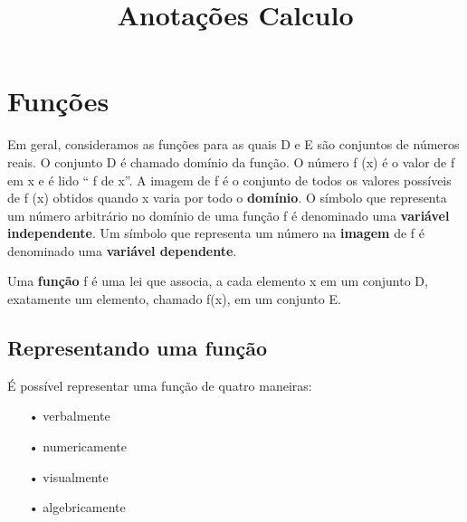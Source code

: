 \documentclass[10pt,a4paper]{article}
\title{Anotações Calculo}
\begin{document}
\maketitle
\tableofcontents
\newpage


\section{Funções}
Em geral, consideramos as funções para as quais D e E são conjuntos de números reais. O conjunto D é chamado domínio da função. O número f (x) é o valor de f em x e é lido “ f de x”. A imagem de f é o conjunto de todos os valores possíveis de f (x) obtidos quando x varia por todo o \textbf{domínio}. O símbolo que representa um número arbitrário no domínio de uma função f é denominado uma \textbf{variável independente}. Um símbolo que representa um número na \textbf{imagem} de f é denominado uma \textbf{variável dependente}.
\begin{df}
	Uma \textbf{função} f é uma lei que associa, a cada elemento x em um conjunto D, exatamente um elemento, chamado f(x), em um conjunto E.
\end{df}
\subsection*{Representando uma função}
\begin{multicols}{2}

\columnbreak
É possível representar uma função de quatro maneiras:
\begin{itemize}
	\item[•]verbalmente
	\item[•]numericamente
	\item[•]visualmente
	\item[•]algebricamente
\end{itemize}

\end{multicols}
\end{document}
